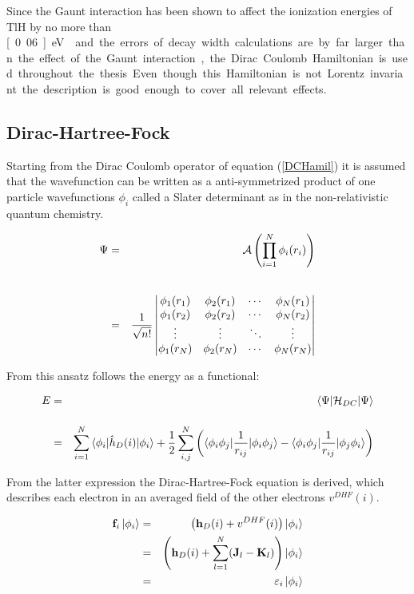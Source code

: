 Since the Gaunt interaction has been shown to affect the ionization energies of
TlH by no more than \unit[0.06]{eV} \cite{Pernpointner05} and the errors of
decay width calculations
are by far larger than the effect of the
Gaunt interaction, the Dirac Coulomb Hamiltonian is used throughout the thesis.
Even though this Hamiltonian is not Lorentz invariant the description is good
enough to cover all relevant effects.

\subsection{Dirac-Hartree-Fock}
Starting from the Dirac Coulomb operator of equation (\ref{DCHamil}) it is assumed
that the wavefunction can be written as a anti-symmetrized product of one particle
wavefunctions $\phi_i$ called a Slater determinant as in the
non-relativistic quantum chemistry.

\begin{eqnarray}
\Psi &=& \mathcal{A} \left(\prod\limits_{i=1}^N\phi_i(r_i)\right)\\\vphantom{\rule{0pt}{50pt}}
     &=& \frac1{\sqrt{n!}}\begin{vmatrix}
\phi_1(r_1) & \phi_2(r_1) & \cdots & \phi_N(r_1)\\
\phi_1(r_2) & \phi_2(r_2) & \cdots & \phi_N(r_2)\\
\vdots      & \vdots     & \ddots  & \vdots\\
\phi_1(r_N) & \phi_2(r_N) & \cdots & \phi_N(r_N)\\
\end{vmatrix}
\end{eqnarray}

From this ansatz follows the energy as a functional:

\begin{eqnarray}
  E &=& \braket{\Psi|\mathcal{H}_{DC}|\Psi}\\\vphantom{\rule{0pt}{30pt}}
  &=& \sum\limits_{i=1}^N\braket{\phi_i|\hat{h}_D(i)|\phi_i}  + \frac12 \sum\limits_{i,j}^N\left(\braket{\phi_i\phi_j|\frac1{r_{ij}}|\phi_i\phi_j} - \braket{\phi_i\phi_j|\frac1{r_{ij}}|\phi_j\phi_i}\right)
\end{eqnarray}

From the latter expression the Dirac-Hartree-Fock equation is derived, which
describes each electron in an averaged field of the other electrons $v^{DHF}(i)$.

\begin{eqnarray}
\mathbf{f}_i\ket{\phi_i} &=& \left(\mathbf{h}_D(i) + v^{DHF}(i)\right)\ket{\phi_i}\\
                         &=& \left( \mathbf{h}_D(i) + \sum\limits_{l=1}^{N}(\mathbf{J}_l-\mathbf{K}_l)\right)\ket{\phi_i}\\
                         &=& \varepsilon_i\ket{\phi_i}
\end{eqnarray}

